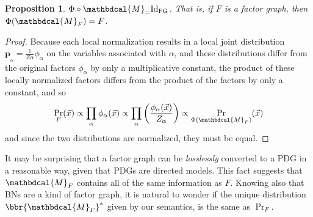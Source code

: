 \documentclass[letterpaper]{article} %
\theoremstyle{plain}
\newtheorem{prop}[theorem]{Proposition}
\theoremstyle{definition}
\theoremstyle{remark}
\newcommand\mat[1]{\mathbf{#1}}
\newcommand{\bp}[1][L]{\mat{p}_{\!_{#1}\!}}
\newcommand{\dg}[1]{\mathbdcal{#1}}
\newcommand{\PDGof}[1]{{\dg M}_{#1}}
\begin{document}
{\begin{prop}\label{prop:fg-pdg-lossless}
	$\Phi \circ \PDGof = \mathrm{Id}_{\text{FG}}$. That is, if $F$ is a factor graph, then $\Phi(\PDGof{F}) = F$.
\end{prop}
\begin{proof}
	Because each local normalization results in a local joint
			distribution $\bp[\alpha] = \frac{1}{Z\alpha}
			\phi_\alpha$ on the variables associated with $\alpha$, and these distributions differ from the original factors $\phi_\alpha$ by only a multiplicative 
		   constant, the product of these locally normalized factors differs from the product of the factors by only a constant, and so 
	\[ \Pr_F(\vec x) \propto \prod_\alpha \phi_\alpha(\vec x) \propto \prod_\alpha \left(\frac{\phi_\alpha(\vec x)}{Z_\alpha}\right) \propto \Pr_{\Phi(\PDGof{F})}(\vec x) \]
	and since the two distributions are normalized, they must be equal.
\end{proof}


It may be surprising that a factor graph can be \emph{losslessly} converted to a PDG in a reasonable way, given that PDGs are directed models.
This fact suggests that $\PDGof{F}$ contains all of the same information as $F$. Knowing also that BNs are a kind of factor graph, it is natural to wonder if the unique distribution $\bbr{\PDGof{F}}^*$ given by our semantics, is the same as $\Pr_F$.		


	
}
\end{document}
